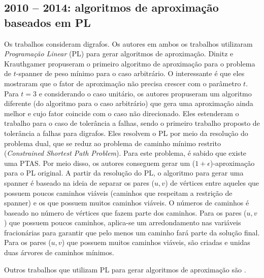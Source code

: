 \subsection{2010 -- 2014:  algoritmos de aproximação baseados em PL}
Os trabalhos \cite{DinitzK2011,DinitzK2011b} consideram digrafos.
Os autores em ambos os trabalhos utilizaram \emph{Programação Linear} (PL)
para gerar 
algoritmos de aproximação. Dinitz e Krauthgamer \cite{DinitzK2011} propuseram 
o primeiro algoritmo de aproximação para o problema de $t$-spanner de peso 
mínimo para o caso arbitrário. 
O interessante é que eles mostraram que o fator 
de aproximação não precisa crescer com o parâmetro $t$. Para $t = 3$ e 
considerando o caso unitário, os autores propuseram um algoritmo diferente 
(do algoritmo para o caso arbitrário) que 
gera uma aproximação ainda melhor e cujo fator coincide com o caso 
não direcionado. Eles estenderam o trabalho para o caso de tolerância a falhas, 
sendo o primeiro trabalho proposto de tolerância a falhas para digrafos. 
Eles resolvem o PL por meio da resolução do problema dual, que se reduz ao problema de
caminho mínimo restrito
(\emph{Constrained Shortest Path Problem}). Para este problema,
é sabido que existe
uma PTAS. Por meio disso, os autores conseguem gerar um ($1 + \epsilon$)-aproximação para o PL original.
A partir da resolução do PL, 
o algoritmo para gerar uma spanner é baseado na ideia de 
separar os pares ($u,v$) de vértices entre aqueles que possuem poucos caminhos 
viáveis (caminhos que respeitam a restrição de spanner) e os que possuem muitos 
caminhos viáveis. O números de caminhos é baseado no número de vértices que 
fazem parte dos caminhos. Para os pares ($u, v$) que possuem poucos caminhos, 
aplica-se
um arredondamento nas variáveis fracionárias 
para garantir que pelo menos um 
caminho fará parte da solução final.
Para os pares ($u,v$) que possuem muitos caminhos viáveis, são criadas e unidas
duas árvores de caminhos mínimos.

Outros trabalhos que utilizam PL para 
gerar algoritmos de aproximação são  \cite{KortsarzP1998,
BermanRR2010,ChlamtacDK2012,BermanBMRY2013,BermanBGRWY2014}.

